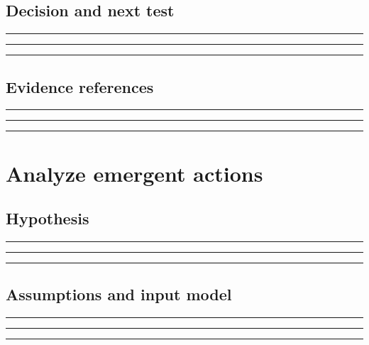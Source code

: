 \documentclass[11pt]{article}
\begin{document}
\subsection{Decision and next test}
\noindent\rule{\linewidth}{0.35pt}\par\vspace{0.22in}
\noindent\rule{\linewidth}{0.35pt}\par\vspace{0.22in}
\noindent\rule{\linewidth}{0.35pt}\par\vspace{0.18in}

\subsection{Evidence references}
\noindent\rule{\linewidth}{0.35pt}\par\vspace{0.22in}
\noindent\rule{\linewidth}{0.35pt}\par\vspace{0.22in}
\noindent\rule{\linewidth}{0.35pt}\par\vspace{0.18in}
\clearpage

\section{Analyze emergent actions}

\subsection{Hypothesis}
\noindent\rule{\linewidth}{0.35pt}\par\vspace{0.22in}
\noindent\rule{\linewidth}{0.35pt}\par\vspace{0.22in}
\noindent\rule{\linewidth}{0.35pt}\par\vspace{0.18in}

\subsection{Assumptions and input model}
\noindent\rule{\linewidth}{0.35pt}\par\vspace{0.22in}
\noindent\rule{\linewidth}{0.35pt}\par\vspace{0.22in}
\noindent\rule{\linewidth}{0.35pt}\par\vspace{0.18in}
\end{document}
